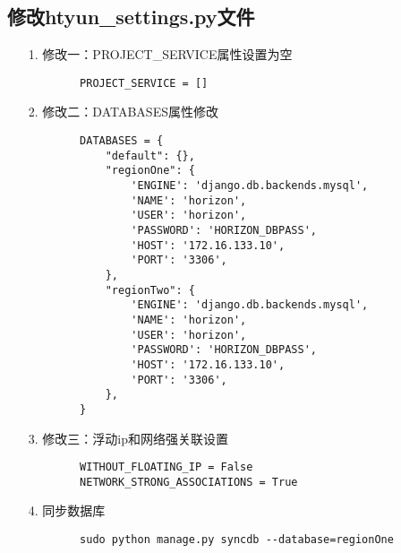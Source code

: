 \documentclass[a4paper,left=1.5cm,right=1.5cm,11pt]{article}
\begin{document}
\tableofcontents

\clearpage

\subsection{修改htyun_settings.py文件}
	\begin{itemize}
        \item[1.]修改一：PROJECT_SERVICE属性设置为空
		\begin{lstlisting}
		PROJECT_SERVICE = []
		\end{lstlisting}
		\item[2.]修改二：DATABASES属性修改
		\begin{lstlisting}
		DATABASES = {
			"default": {},
			"regionOne": {
				'ENGINE': 'django.db.backends.mysql',
				'NAME': 'horizon',
				'USER': 'horizon',
				'PASSWORD': 'HORIZON_DBPASS',
				'HOST': '172.16.133.10',
				'PORT': '3306',
			},
			"regionTwo": {
				'ENGINE': 'django.db.backends.mysql',
				'NAME': 'horizon',
				'USER': 'horizon',
				'PASSWORD': 'HORIZON_DBPASS',
				'HOST': '172.16.133.10',
				'PORT': '3306',
			},
		}
		\end{lstlisting}
		\item[3.]修改三：浮动ip和网络强关联设置
		\begin{lstlisting}		
		WITHOUT_FLOATING_IP = False
		NETWORK_STRONG_ASSOCIATIONS = True
		\end{lstlisting}
		\item[4.]同步数据库
		\begin{lstlisting}
		sudo python manage.py syncdb --database=regionOne
		\end{lstlisting}
    \end{itemize}
\end{document}
